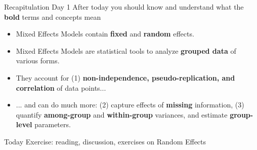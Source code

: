 \documentclass{beamer}
\begin{document}
\begin{frame}{Recapitulation Day 1}
After today you should know and understand what the \textbf{bold} terms and concepts mean
  \begin{itemize}
    \item Mixed Effects Models contain \textbf{fixed} and \textbf{random} effects.
    \item Mixed Effects Models are statistical tools to analyze \textbf{grouped data} of various forms.
    \item They account for (1) \textbf{non-independence, pseudo-replication, and correlation} of data points...
    \item ... and can do much more: (2) capture effects of \textbf{missing} information, (3) quantify \textbf{among-group} and \textbf{within-group} variances, and estimate \textbf{group-level} parameters.
  \end{itemize}
  Today Exercise: reading, discussion, exercises on Random Effects
  
\end{frame}
\end{document}

